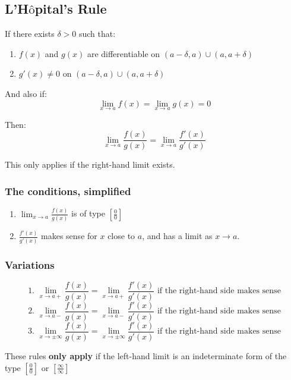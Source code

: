 \documentclass[11pt]{article}
\begin{document}
\newpage

\subsection{L'H\(\text{\^o}\)pital's Rule}
\label{sec:orgb2bec24}
If there exists \(\delta > 0\) such that:
\begin{enumerate}
\item \(f(x)\) and \(g(x)\) are differentiable on \((a - \delta, a) \cup (a, a + \delta)\)
\item \(g'(x) \neq 0\) on \((a - \delta, a) \cup (a, a + \delta)\)
\end{enumerate}

And also if:
\[\lim_{x \rightarrow a} f(x) = \lim_{x \rightarrow a} g(x) = 0\]

Then:
\[\lim_{x \rightarrow a} \frac{f(x)}{g(x)} = \lim_{x \rightarrow a} \frac{f'(x)}{g'(x)}\]

This only applies if the right-hand limit exists.

\subsubsection{The conditions, simplified}
\label{sec:orgc1e1de4}
\begin{enumerate}
\item \(\lim_{x \rightarrow a} \frac{f(x)}{g(x)}\) is of type \(\left[ \frac{0}{0}\right]\)
\item \(\frac{f'(x)}{g'(x)}\) makes sense for \(x\) close to \(a\), and has a limit as \(x \rightarrow a\).
\end{enumerate}

\subsubsection{Variations}
\label{sec:orgd7efa9d}
\[\text{1. } \lim_{x \rightarrow a+} \frac{f(x)}{g(x)} = \lim_{x \rightarrow a+} \frac{f'(x)}{g'(x)} \text{ if the right-hand side makes sense}\]
\[\text{2. } \lim_{x \rightarrow a-} \frac{f(x)}{g(x)} = \lim_{x \rightarrow a-} \frac{f'(x)}{g'(x)} \text{ if the right-hand side makes sense}\]
\[\text{3. } \lim_{x \rightarrow \pm \infty} \frac{f(x)}{g(x)} = \lim_{x \rightarrow \pm \infty} \frac{f'(x)}{g'(x)} \text{ if the right-hand side makes sense}\]

These rules \textbf{only apply} if the left-hand limit is an indeterminate form of the type \(\left[\frac{0}{0} \right]\) or \(\left[ \frac{\infty}{\infty} \right]\)
\end{document}

